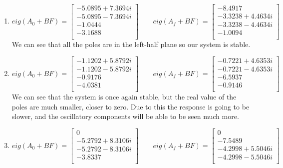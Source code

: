 \documentclass{article}
\begin{document}
\begin{enumerate}[1)]
\item
$$ eig(A_0 + BF) =
\begin{bmatrix}
-5.0895 + 7.3694i \\
-5.0895 - 7.3694i \\
-1.0444 \\
-3.1688 \\
\end{bmatrix}
\qquad
eig(A_f + BF) =
\begin{bmatrix}
-8.4917 \\
-3.3238 + 4.4634i \\
-3.3238 - 4.4634i \\
-1.0094 \\
\end{bmatrix}
$$
We can see that all the poles are in the left-half plane so our system is stable.
\item
$$ eig(A_0 + BF) =
\begin{bmatrix}
-1.1202 + 5.8792i \\
-1.1202 - 5.8792i \\
-0.9176 \\
-4.0381 \\
\end{bmatrix}
\qquad
eig(A_f + BF) =
\begin{bmatrix}
-0.7221 + 4.6353i \\
-0.7221 - 4.6353i \\
-6.5937 \\
-0.9146 \\
\end{bmatrix}
$$
We can see that the system is once again stable, but the real value of the poles are much smaller, closer to zero.
Due to this the response is going to be slower, and the oscillatory components will be able to be seen much more.
\item
$$ eig(A_0 + BF) =
\begin{bmatrix}
0 \\
-5.2792 + 8.3106i \\
-5.2792 - 8.3106i \\
-3.8337 \\
\end{bmatrix}
\qquad
eig(A_f + BF) =
\begin{bmatrix}
0 \\
-7.5489 \\
-4.2998 + 5.5046i \\
-4.2998 - 5.5046i \\
\end{bmatrix}
$$
\end{enumerate}
\end{document}
